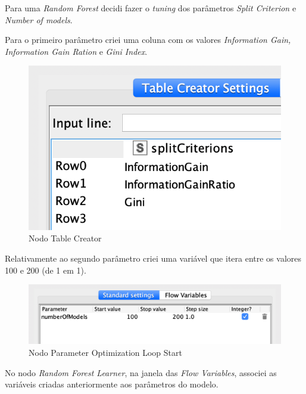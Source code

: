 Para uma \textit{Random Forest} decidi fazer o \textit{tuning} dos parâmetros \textit{Split Criterion} e \textit{Number of models}.

Para o primeiro parâmetro criei uma coluna com os valores \textit{Information Gain, Information Gain Ration} e \textit{Gini Index}.

\begin{figure}[H]
    \centering
    \includegraphics[scale=0.6]{Images/T5_b.png}
    \caption{Nodo Table Creator}
\end{figure}

Relativamente ao segundo parâmetro criei uma variável que itera entre os valores 100 e 200 (de 1 em 1). 

\begin{figure}[H]
    \centering
    \includegraphics[scale=0.5]{Images/T5_c.png}
    \caption{Nodo Parameter Optimization Loop Start}
\end{figure}

\clearpage

No nodo \textit{Random Forest Learner}, na janela das \textit{Flow Variables}, associei as variáveis criadas anteriormente aos parâmetros do modelo.

